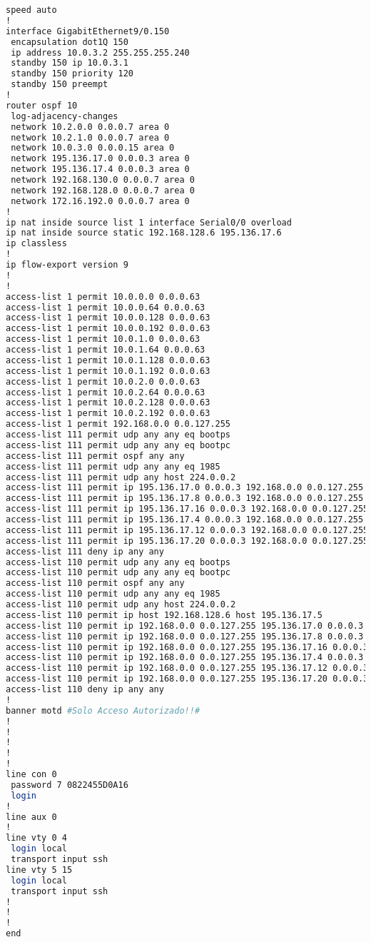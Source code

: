 \begin{lstlisting}[language=Bash, caption={Configuración Completa Router Principal}]
 speed auto
!
interface GigabitEthernet9/0.150
 encapsulation dot1Q 150
 ip address 10.0.3.2 255.255.255.240
 standby 150 ip 10.0.3.1
 standby 150 priority 120
 standby 150 preempt
!
router ospf 10
 log-adjacency-changes
 network 10.2.0.0 0.0.0.7 area 0
 network 10.2.1.0 0.0.0.7 area 0
 network 10.0.3.0 0.0.0.15 area 0
 network 195.136.17.0 0.0.0.3 area 0
 network 195.136.17.4 0.0.0.3 area 0
 network 192.168.130.0 0.0.0.7 area 0
 network 192.168.128.0 0.0.0.7 area 0
 network 172.16.192.0 0.0.0.7 area 0
!
ip nat inside source list 1 interface Serial0/0 overload
ip nat inside source static 192.168.128.6 195.136.17.6 
ip classless
!
ip flow-export version 9
!
!
access-list 1 permit 10.0.0.0 0.0.0.63
access-list 1 permit 10.0.0.64 0.0.0.63
access-list 1 permit 10.0.0.128 0.0.0.63
access-list 1 permit 10.0.0.192 0.0.0.63
access-list 1 permit 10.0.1.0 0.0.0.63
access-list 1 permit 10.0.1.64 0.0.0.63
access-list 1 permit 10.0.1.128 0.0.0.63
access-list 1 permit 10.0.1.192 0.0.0.63
access-list 1 permit 10.0.2.0 0.0.0.63
access-list 1 permit 10.0.2.64 0.0.0.63
access-list 1 permit 10.0.2.128 0.0.0.63
access-list 1 permit 10.0.2.192 0.0.0.63
access-list 1 permit 192.168.0.0 0.0.127.255
access-list 111 permit udp any any eq bootps
access-list 111 permit udp any any eq bootpc
access-list 111 permit ospf any any
access-list 111 permit udp any any eq 1985
access-list 111 permit udp any host 224.0.0.2
access-list 111 permit ip 195.136.17.0 0.0.0.3 192.168.0.0 0.0.127.255
access-list 111 permit ip 195.136.17.8 0.0.0.3 192.168.0.0 0.0.127.255
access-list 111 permit ip 195.136.17.16 0.0.0.3 192.168.0.0 0.0.127.255
access-list 111 permit ip 195.136.17.4 0.0.0.3 192.168.0.0 0.0.127.255
access-list 111 permit ip 195.136.17.12 0.0.0.3 192.168.0.0 0.0.127.255
access-list 111 permit ip 195.136.17.20 0.0.0.3 192.168.0.0 0.0.127.255
access-list 111 deny ip any any
access-list 110 permit udp any any eq bootps
access-list 110 permit udp any any eq bootpc
access-list 110 permit ospf any any
access-list 110 permit udp any any eq 1985
access-list 110 permit udp any host 224.0.0.2
access-list 110 permit ip host 192.168.128.6 host 195.136.17.5
access-list 110 permit ip 192.168.0.0 0.0.127.255 195.136.17.0 0.0.0.3
access-list 110 permit ip 192.168.0.0 0.0.127.255 195.136.17.8 0.0.0.3
access-list 110 permit ip 192.168.0.0 0.0.127.255 195.136.17.16 0.0.0.3
access-list 110 permit ip 192.168.0.0 0.0.127.255 195.136.17.4 0.0.0.3
access-list 110 permit ip 192.168.0.0 0.0.127.255 195.136.17.12 0.0.0.3
access-list 110 permit ip 192.168.0.0 0.0.127.255 195.136.17.20 0.0.0.3
access-list 110 deny ip any any
!
banner motd #Solo Acceso Autorizado!!#
!
!
!
!
!
line con 0
 password 7 0822455D0A16
 login
!
line aux 0
!
line vty 0 4
 login local
 transport input ssh
line vty 5 15
 login local
 transport input ssh
!
!
!
end


\end{lstlisting}

